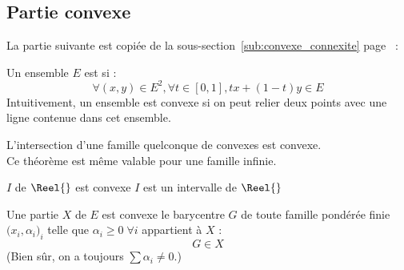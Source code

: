 \documentclass[11pt,a4paper,fleqn,pdftex]{report}
\begin{document}
\subsection{Partie convexe} %
\label{sub:partie_convexe}
La partie suivante est copiée de la sous-section~\ref{sub:convexe_connexite} page~\pageref{sub:convexe_connexite} : 
\begin{dfn}[Convexe]
    \begin{minipage}{0.6\textwidth}
        Un ensemble $E$ est  si : 
    \begin{equation}
    \forall (x,y) \in E^2, \forall t \in [0,1], \boxed{tx + (1-t)y \in E}
    \end{equation}
    Intuitivement, un ensemble est convexe si on peut relier deux points avec une ligne contenue dans cet ensemble.
    \end{minipage}\hspace{5mm}
    \begin{minipage}{0.3\textwidth}
    \end{minipage}
\end{dfn}
\begin{theorem}
     L'intersection d'une famille quelconque de convexes est convexe.\\[\baselineskip]
      Ce théorème est même valable pour une famille infinie.
\end{theorem}
\begin{theorem}
    $I$ de $\Reel{}$ est convexe  $I$ est un intervalle de $\Reel{}$
\end{theorem}
\begin{itheorem}
     Une partie $X$ de $E$ est convexe \ssi{} le barycentre $G$ de toute famille pondérée finie $\big( x_i,\alpha_i \big)_i$ telle que $\alpha_i \ge 0\; \forall i$ appartient à $X$ : 
     \begin{equation}
     G \in X
     \end{equation}
     (Bien sûr, on a toujours $\sum \alpha_i \neq 0$.)
\end{itheorem}
\end{document}

